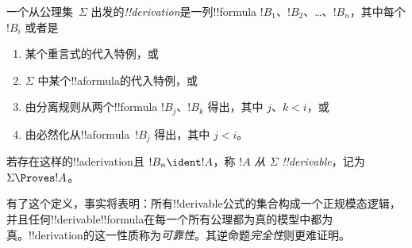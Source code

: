 \documentclass[../../../include/open-logic-section]{subfiles}
\begin{document}
\begin{defn}
一个从公理集~$\Sigma$ 出发的\emph{!!{derivation}}是一列!!{formula} $!B_1$、$!B_2$、\dots、$!B_n$，其中每个 $!B_i$ 或者是
\begin{enumerate}
\item 某个重言式的代入特例，或
\item $\Sigma$ 中某个!!a{formula}的代入特例，或
\item 由分离规则从两个!!{formula} $!B_j$、$!B_k$ 得出，其中 $j$、$k < i$，或
\item 由必然化从!!a{formula}~$!B_j$ 得出，其中 $j < i$。
\end{enumerate}
若存在这样的!!a{derivation}且 $!B_n \ident !A$，称 $!A$ \emph{从 $\Sigma$ !!{derivable}}，记为 $\Sigma \Proves !A$。
\end{defn}

有了这个定义，事实将表明：所有!!{derivable}公式的集合构成一个正规模态逻辑，并且任何!!{derivable}!!{formula}在每一个所有公理都为真的模型中都为真。!!{derivation}的这一性质称为\emph{可靠性}。其逆命题\emph{完全性}则更难证明。
\end{document}
